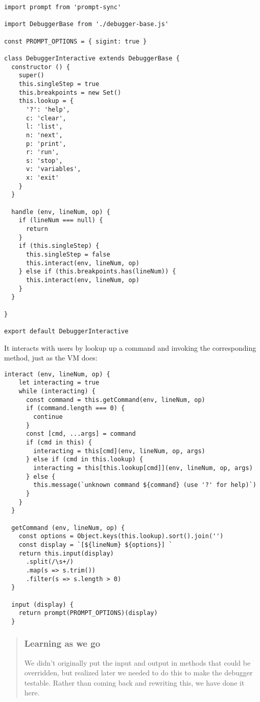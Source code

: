 \documentclass[krantzl]{krantz}
\newenvironment{callout}{\savenotes\begin{tBox}\begin{quotation}\toggletrue{inbox}\renewcommand{\thempfootnote}{\arabic{footnote}}}{\end{quotation}\vspace{\baselineskip}\end{tBox}\togglefalse{inbox}\spewnotes}
\begin{document}
\begin{lstlisting}[frame=tblr]
import prompt from 'prompt-sync'

import DebuggerBase from './debugger-base.js'

const PROMPT_OPTIONS = { sigint: true }

class DebuggerInteractive extends DebuggerBase {
  constructor () {
    super()
    this.singleStep = true
    this.breakpoints = new Set()
    this.lookup = {
      '?': 'help',
      c: 'clear',
      l: 'list',
      n: 'next',
      p: 'print',
      r: 'run',
      s: 'stop',
      v: 'variables',
      x: 'exit'
    }
  }

  handle (env, lineNum, op) {
    if (lineNum === null) {
      return
    }
    if (this.singleStep) {
      this.singleStep = false
      this.interact(env, lineNum, op)
    } else if (this.breakpoints.has(lineNum)) {
      this.interact(env, lineNum, op)
    }
  }

}

export default DebuggerInteractive
\end{lstlisting}



\noindent It interacts with users by lookup up a command and invoking the corresponding method,
just as the VM does:


\begin{lstlisting}[frame=tblr]
  interact (env, lineNum, op) {
    let interacting = true
    while (interacting) {
      const command = this.getCommand(env, lineNum, op)
      if (command.length === 0) {
        continue
      }
      const [cmd, ...args] = command
      if (cmd in this) {
        interacting = this[cmd](env, lineNum, op, args)
      } else if (cmd in this.lookup) {
        interacting = this[this.lookup[cmd]](env, lineNum, op, args)
      } else {
        this.message(`unknown command ${command} (use '?' for help)`)
      }
    }
  }

  getCommand (env, lineNum, op) {
    const options = Object.keys(this.lookup).sort().join('')
    const display = `[${lineNum} ${options}] `
    return this.input(display)
      .split(/\s+/)
      .map(s => s.trim())
      .filter(s => s.length > 0)
  }

  input (display) {
    return prompt(PROMPT_OPTIONS)(display)
  }
\end{lstlisting}


\begin{callout}


\subsubsection*{Learning as we go}


We didn’t originally put the input and output in methods that could be overridden,
but realized later we needed to do this to make the debugger testable.
Rather than coming back and rewriting this,
we have done it here.

\end{callout}
\end{document}
